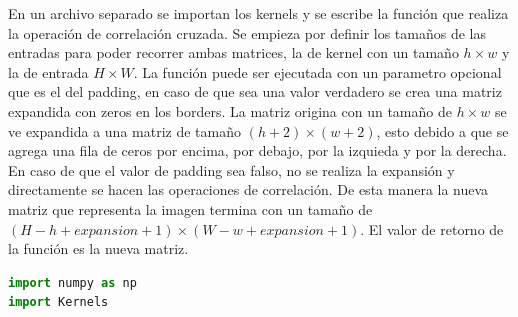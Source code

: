\documentclass{article}
\begin{document}
En un archivo separado se importan los kernels y se escribe la función que realiza la operación de correlación cruzada. Se empieza por definir los tamaños de las entradas
para poder recorrer ambas matrices, la de kernel con un tamaño $h\times$$w$ y la de entrada $H\times$$W$. La función puede ser ejecutada con un parametro opcional que es el del padding, en caso de que sea una valor verdadero 
se crea una matriz expandida con zeros en los borders. La matriz origina con un tamaño de $h\times$$w$ se ve expandida a una matriz de tamaño $(h+2)\times$$(w+2)$, esto debido a que se agrega una fila de ceros por encima, 
por debajo, por la izquieda y por la derecha. En caso de que el valor de padding sea falso, no se realiza la expansión y directamente se hacen las operaciones de correlación. De esta manera la nueva matriz que representa la imagen 
termina con un tamaño de $(H-h+expansion+1)\times$$(W-w+expansion+1)$. El valor de retorno de la función es la nueva matriz.  \\
\begin{lstlisting}[language=python]
import numpy as np 
import Kernels


\end{lstlisting}$$
\end{document}
